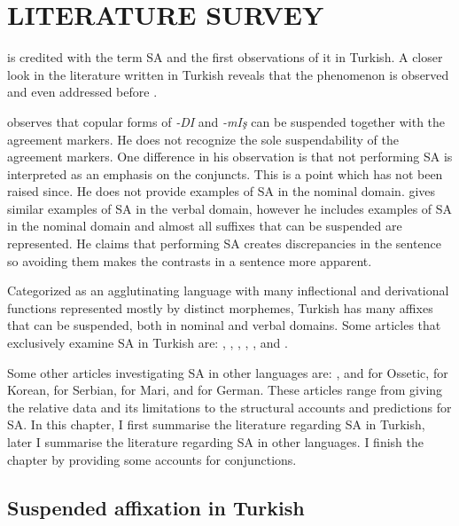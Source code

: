 \chapter{\MakeUppercase{literature survey}} \label{litsurvey}


\cite{geoffrey1967turkish} is credited with the term SA and the first observations of it in Turkish. A closer look in the literature written in Turkish reveals that the phenomenon is observed and even addressed before \citep{emre1945turk,gencan1966dilbilgisi}.

\citet[par 219]{emre1945turk} observes that copular forms of \textit{-DI} and \textit{-mIş} can be suspended together with the agreement markers. He does not recognize the sole suspendability of the agreement markers. One difference in his observation is that not performing SA is interpreted as an emphasis on the conjuncts. This is a point which has not been raised since. He does not provide examples of SA in the nominal domain. \citet[par 382]{gencan1966dilbilgisi} gives similar examples of SA in the verbal domain, however he includes examples of SA in the nominal domain and almost all suffixes that can be suspended are represented. He claims that performing SA creates discrepancies in the sentence so avoiding them makes the contrasts in a sentence more apparent.  

Categorized as an agglutinating language with many inflectional and derivational functions represented mostly by distinct morphemes, Turkish has many affixes that can be suspended, both in nominal and verbal domains. Some articles that exclusively examine SA in Turkish are: \cite{orgun1995flat}, \cite{kabak2007turkish}, \cite{broadwell2008turkish}, \cite{kornfilt2012revisiting}, \cite{kharytonava2011morphology,kharytonava2012taming,kharytonava2012word}, and \cite{akkucs2016suspended}.

Some other articles investigating SA in other languages are: \cite{erschler2012suspended}, and \cite{erschler2018suspended} for Ossetic, \cite{yoon2017lexical} for Korean, \cite{despic2017suspended} for Serbian, \cite{guseva2017postsyntactic} for Mari, and \cite{pounder2006broken} for German. These articles range from giving the relative data and its limitations to the structural accounts and predictions for SA. In this chapter, I first summarise the literature regarding SA in Turkish, later I summarise the literature regarding SA in other languages. I finish the chapter by providing some accounts for conjunctions.


\section{Suspended affixation in Turkish}

